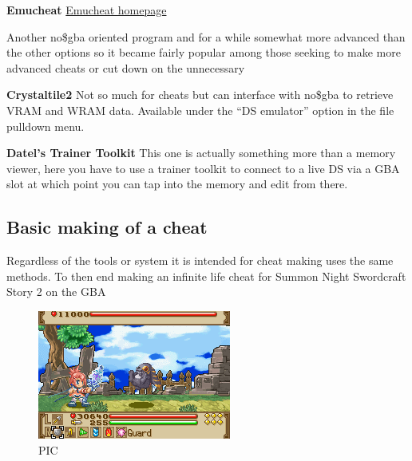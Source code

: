 \documentclass[
]{book}
\begin{document}
\textbf{Emucheat} \href{http://www.emucheat.com/}{Emucheat homepage}

Another no\$gba oriented program and for a while somewhat more advanced than the other options so it became fairly popular among those seeking to make more advanced cheats or cut down on the unnecessary

\textbf{Crystaltile2} Not so much for cheats but can interface with no\$gba to retrieve VRAM and WRAM data. Available under the ``DS emulator'' option in the file pulldown menu.

\textbf{Datel's Trainer Toolkit} This one is actually something more than a memory viewer, here you have to use a trainer toolkit to connect to a live DS via a GBA slot at which point you can tap into the memory and edit from there.

\hypertarget{basic-making-of-a-cheat}{%
\subsection{Basic making of a cheat}\label{basic-making-of-a-cheat}}

Regardless of the tools or system it is intended for cheat making uses the same methods. To then end making an infinite life cheat for Summon Night Swordcraft Story 2 on the GBA

\begin{figure}
\centering
\includegraphics{images/201_home_fast6191_romhackingguide_unrenamed_fil___ginal_borders_romhackingguidecheatexample_1.png}
\caption{PIC}
\end{figure}
\end{document}
